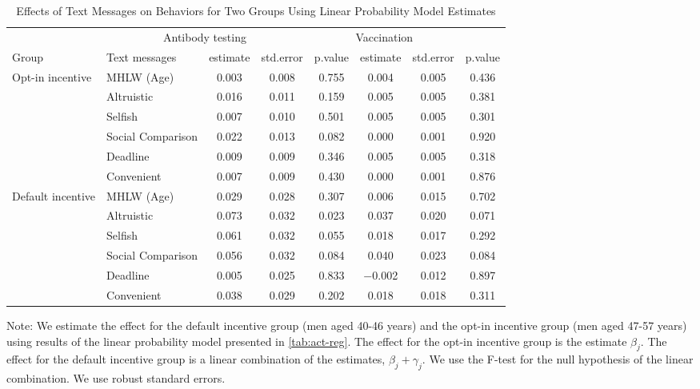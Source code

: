 \begin{table}

\caption{Effects of Text Messages on Behaviors for Two Groups Using Linear Probability Model Estimates \label{tab:act-reg-ftest}}
\centering
\fontsize{9}{11}\selectfont
\begin{threeparttable}
\begin{tabular}[t]{>{\raggedright\arraybackslash}p{5em}lcccccc}
\toprule
\multicolumn{2}{c}{ } & \multicolumn{3}{c}{Antibody testing} & \multicolumn{3}{c}{Vaccination} \\
\cmidrule(l{3pt}r{3pt}){3-5} \cmidrule(l{3pt}r{3pt}){6-8}
Group & Text messages & estimate & std.error & p.value & estimate  & std.error  & p.value \\
\midrule
Opt-in incentive & MHLW (Age) & \num{0.003} & \num{0.008} & \num{0.755} & \num{0.004} & \num{0.005} & \num{0.436}\\
 & Altruistic & \num{0.016} & \num{0.011} & \num{0.159} & \num{0.005} & \num{0.005} & \num{0.381}\\
 & Selfish & \num{0.007} & \num{0.010} & \num{0.501} & \num{0.005} & \num{0.005} & \num{0.301}\\
 & Social Comparison & \num{0.022} & \num{0.013} & \num{0.082} & \num{0.000} & \num{0.001} & \num{0.920}\\
 & Deadline & \num{0.009} & \num{0.009} & \num{0.346} & \num{0.005} & \num{0.005} & \num{0.318}\\
 & Convenient & \num{0.007} & \num{0.009} & \num{0.430} & \num{0.000} & \num{0.001} & \num{0.876}\\
Default incentive & MHLW (Age) & \num{0.029} & \num{0.028} & \num{0.307} & \num{0.006} & \num{0.015} & \num{0.702}\\
 & Altruistic & \num{0.073} & \num{0.032} & \num{0.023} & \num{0.037} & \num{0.020} & \num{0.071}\\
 & Selfish & \num{0.061} & \num{0.032} & \num{0.055} & \num{0.018} & \num{0.017} & \num{0.292}\\
 & Social Comparison & \num{0.056} & \num{0.032} & \num{0.084} & \num{0.040} & \num{0.023} & \num{0.084}\\
 & Deadline & \num{0.005} & \num{0.025} & \num{0.833} & \num{-0.002} & \num{0.012} & \num{0.897}\\
 & Convenient & \num{0.038} & \num{0.029} & \num{0.202} & \num{0.018} & \num{0.018} & \num{0.311}\\
\bottomrule
\end{tabular}
\begin{tablenotes}
\item Note: We estimate the effect for the default incentive group (men aged 40-46 years) and the opt-in incentive group (men aged 47-57 years) using results of the linear probability model presented in \ref{tab:act-reg}. The effect for the opt-in incentive group is the estimate $\beta_j$. The effect for the default incentive group is a linear combination of the estimates, $\beta_j + \gamma_j$. We use the F-test for the null hypothesis of the linear combination. We use robust standard errors.
\end{tablenotes}
\end{threeparttable}
\end{table}
